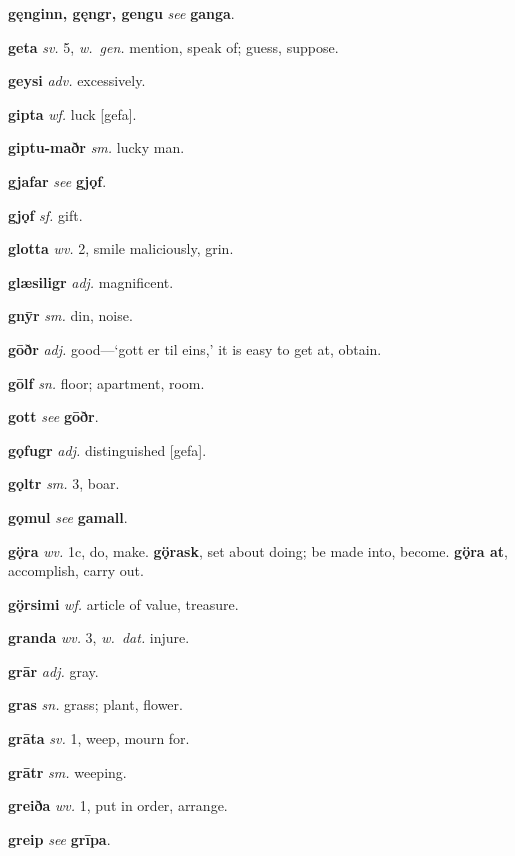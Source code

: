 \documentclass[12pt,letterpaper]{book}
\begin{document}
\noindent
\textbf{gęnginn, gęngr, gengu} \textit{} \textit{see} \textbf{ganga}.

\noindent
\textbf{geta} \textit{sv.} 5, \textit{w.\ gen.} mention, speak of; guess,
	suppose.

\noindent
\textbf{geysi} \textit{adv.} excessively.

\noindent
\textbf{gipta} \textit{wf.} luck [gefa].

\noindent
\textbf{giptu-maðr} \textit{sm.} lucky man.

\noindent
\textbf{gjafar} \textit{} \textit{see} \textbf{gjǫf}.

\noindent
\textbf{gjǫf} \textit{sf.} gift.

\noindent
\textbf{glotta} \textit{wv.} 2, smile maliciously, grin.

\noindent
\textbf{glæsiligr} \textit{adj.} magnificent.

\noindent
\textbf{gnȳr} \textit{sm.} din, noise.

\noindent
\textbf{gōðr} \textit{adj.} good---`gott er til eins,' it is easy to get
	at, obtain.

\noindent
\textbf{gōlf} \textit{sn.} floor; apartment, room.

\noindent
\textbf{gott} \textit{} \textit{see} \textbf{gōðr}.

\noindent
\textbf{gǫfugr} \textit{adj.} distinguished [gefa].

\noindent
\textbf{gǫltr} \textit{sm.} 3, boar.

\noindent
\textbf{gǫmul} \textit{} \textit{see} \textbf{gamall}.

\noindent
\textbf{gǫ̈ra} \textit{wv.} 1c, do, make.  \textbf{gǫ̈rask}, set about
	doing; be made into, become.  \textbf{gǫ̈ra at}, accomplish,
	carry out.

\noindent
\textbf{gǫ̈rsimi} \textit{wf.} article of value, treasure.

\noindent
\textbf{granda} \textit{wv.} 3, \textit{w.\ dat.} injure.

\noindent
\textbf{grār} \textit{adj.} gray.

\noindent
\textbf{gras} \textit{sn.} grass; plant, flower.

\noindent
\textbf{grāta} \textit{sv.} 1, weep, mourn for.

\noindent
\textbf{grātr} \textit{sm.} weeping.

\noindent
\textbf{greiða} \textit{wv.} 1, put in order, arrange.

\noindent
\textbf{greip} \textit{} \textit{see} \textbf{grīpa}.
\end{document}
